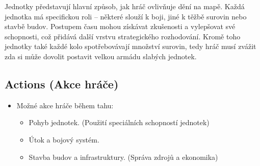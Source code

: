 Jednotky představují hlavní způsob, jak hráč ovlivňuje dění na mapě. Každá jednotka má specifickou roli – některé slouží k boji, jiné k těžbě surovin nebo stavbě budov. Postupem času mohou získávat zkušenosti a vylepšovat své schopnosti, což přidává další vrstvu strategického rozhodování. Kromě toho jednotky také každé kolo spotřebovávají množství surovin, tedy hráč musí zvážit zda si může dovolit postavit velkou armádu slabých jednotek.


\subsection{Actions (Akce hráče)}
\begin{itemize}
    \item Možné akce hráče během tahu:
    \begin{itemize}
        \item Pohyb jednotek. (Použití speciálních schopností jednotek)
        \item Útok a bojový systém. 
        \item Stavba budov a infrastruktury. (Správa zdrojů a ekonomika)
    \end{itemize}
\end{itemize}


